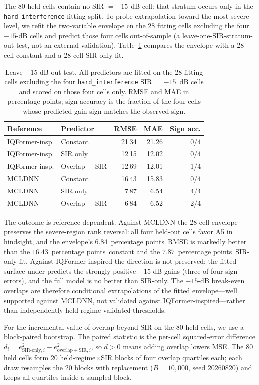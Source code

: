 \documentclass[letterpaper,onecolumn,11pt,journal]{IEEEtran}
\newcommand{\pp}{percentage points}
\begin{document}
The 80 held cells contain no SIR $=-15$~dB cell: that stratum occurs only in
the \texttt{hard\_interference} fitting split. To probe extrapolation toward
the most severe level, we refit the two-variable envelope on the 28 fitting
cells excluding the four $-15$-dB cells and predict those four cells
out-of-sample (a leave-one-SIR-stratum-out test, not an external validation).
Table~\ref{tab:leave15} compares the envelope with a 28-cell constant and a
28-cell SIR-only fit.

\begin{table}[t]
\centering
\caption{Leave-$-15$-dB-out test. All predictors are fitted on the 28
fitting cells excluding the four \texttt{hard\_interference} SIR $=-15$~dB
cells and scored on those four cells only. RMSE and MAE in \pp; sign
accuracy is the fraction of the four cells whose predicted gain sign matches
the observed sign.}
\label{tab:leave15}
\footnotesize
\setlength{\tabcolsep}{4pt}
\begin{tabular}{llrrr}
\toprule
Reference & Predictor & RMSE & MAE & Sign acc.\\
\midrule
IQFormer-insp. & Constant & 21.34 & 21.26 & 0/4\\
IQFormer-insp. & SIR only & 12.15 & 12.02 & 0/4\\
IQFormer-insp. & Overlap + SIR & 12.69 & 12.01 & 1/4\\
\midrule
MCLDNN & Constant & 16.43 & 15.83 & 0/4\\
MCLDNN & SIR only & 7.87 & 6.54 & 4/4\\
MCLDNN & Overlap + SIR & 6.84 & 6.52 & 2/4\\
\bottomrule
\end{tabular}
\end{table}

The outcome is reference-dependent. Against MCLDNN the 28-cell envelope
preserves the severe-region rank reversal: all four held-out cells favor A5
in hindsight, and the envelope's $6.84$~\pp\ RMSE is markedly better than the
$16.43$~\pp\ constant and the $7.87$~\pp\ SIR-only fit. Against
IQFormer-inspired the direction is not preserved: the fitted surface
under-predicts the strongly positive $-15$-dB gains (three of four sign
errors), and the full model is no better than SIR-only. The $-15$-dB
break-even overlaps are therefore conditional extrapolations of the fitted
envelope---well supported against MCLDNN, not validated against
IQFormer-inspired---rather than independently held-regime-validated
thresholds.

For the incremental value of overlap beyond SIR on the 80 held cells, we use
a block-paired bootstrap. The paired statistic is the per-cell
squared-error difference
$d_i=e^2_{\mathrm{SIR\text{-}only},i}-e^2_{\mathrm{overlap+SIR},i}$, so
$\bar d>0$ means adding overlap lowers MSE. The 80 held cells form 20
held-regime$\times$SIR blocks of four overlap quartiles each; each draw
resamples the 20 blocks with replacement ($B=10{,}000$, seed $20260820$)
and keeps all quartiles inside a sampled block.
\end{document}
